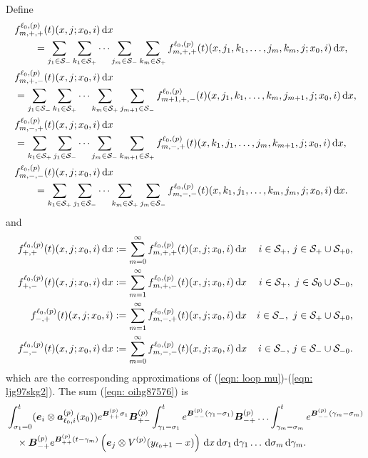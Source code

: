 Define
\begin{align}
	&f_{m,+,+}^{\ell_0,(p)}(t)(x,j;x_0,i) \, \mathrm{d} x \nonumber 
	\\&\qquad= \sum_{j_1\in\mathcal S_-} \sum_{k_1\in\mathcal S_+}\dots \sum_{j_m\in\mathcal S_-}\sum_{k_m\in\mathcal S_+} f_{m,+,+}^{\ell_0,(p)}(t)(x, j_1,k_1,\dots,j_m,k_m, j; x_0,i) \, \mathrm{d} x,\label{eqn: oihg87576}
	\\&f^{\ell_0,(p)}_{m,+,-}(t)(x, j; x_0,i) \, \mathrm{d} x \nonumber
	\\&= \sum_{j_1\in\mathcal S_-} \sum_{k_1\in\mathcal S_+}\dots \sum_{k_m\in\mathcal S_+}\sum_{j_{m+1}\in\mathcal S_-}f^{\ell_0,(p)}_{m+1,+,-}(t)(x, j_1,k_1,\dots,k_m,j_{m+1}, j; x_0,i) \, \mathrm{d} x,
	\\&f^{\ell_0,(p)}_{m,-,+}(t)(x, j; x_0,i) \, \mathrm{d} x \nonumber
	\\&= \sum_{k_1\in\mathcal S_+} \sum_{j_1\in\mathcal S_-}\dots \sum_{j_m\in\mathcal S_-}\sum_{k_{m+1}\in\mathcal S_+}f^{\ell_0,(p)}_{m,-,+}(t)(x, k_1,j_1,\dots,j_m,k_{m+1}, j; x_0,i)  \, \mathrm{d} x,
	\\&f^{\ell_0,(p)}_{m,-,-}(t)(x, j; x_0,i) \, \mathrm{d} x \nonumber 
	\\&\qquad = \sum_{k_1\in\mathcal S_+} \sum_{j_1\in\mathcal S_-}\dots \sum_{k_m\in\mathcal S_+}\sum_{j_m\in\mathcal S_-}f^{\ell_0,(p)}_{m,-,-}(t)(x, k_1, j_1,\dots,k_m,j_m, j; x_0,i) \, \mathrm{d} x.  \label{eqn: many eqns}
\end{align}
and
\begin{align*}
		f^{\ell_0,(p)}_{+,+}(t)(x,j;x_0,i)\, \mathrm{d} x &:= \sum_{m=0}^\infty f^{\ell_0,(p)}_{m,+,+}(t)(x,j;x_0,i)\, \mathrm{d} x & i\in\mathcal{S}_+,\,j\in\mathcal{S}_+\cup\mathcal{S}_{+0},
		\\ f^{\ell_0,(p)}_{+,-}(t)(x,j;x_0,i)\, \mathrm{d} x &:= \sum_{m=1}^\infty f^{\ell_0,(p)}_{m,+,-}(t)(x,j;x_0,i)\, \mathrm{d} x & i\in\mathcal S_+,\,\,j\in\mathcal S_{0}\cup\mathcal{S}_{-0},
		\\ f^{\ell_0,(p)}_{-,+}(t)(x,j;x_0,i) &:= \sum_{m=1}^\infty f^{\ell_0,(p)}_{m,-,+}(t)(x,j;x_0,i)\, \mathrm{d} x & i\in\mathcal S_-,\,\,j\in\mathcal S_{+}\cup\mathcal{S}_{+0},
		\\ f^{\ell_0,(p)}_{-,-}(t)(x,j;x_0,i)\, \mathrm{d} x &:= \sum_{m=0}^\infty f^{\ell_0,(p)}_{m,-,-}(t)(x,j;x_0,i)\, \mathrm{d} x & i\in\mathcal{S}_-,\,j\in\mathcal S_-\cup\mathcal{S}_{-0}.
\end{align*}
which are the corresponding approximations of (\ref{eqn: loop mu})-(\ref{eqn: ljg97skg2}).
The sum (\ref{eqn: oihg87576}) is 
\begin{align}
	&\int_{\sigma_1=0}^t (\boldsymbol e_i\otimes \boldsymbol  a_{\ell_0,i}^{(p)}(x_0)) e^{\boldsymbol{B}^{(p)}_{++}\sigma_1}\boldsymbol{B}^{(p)}_{+-}	\nonumber
	\int_{\gamma_1=\sigma_1}^{t} e^{\boldsymbol{B}^{(p)}_{--}(\gamma_1-\sigma_1)}\boldsymbol{B}^{(p)}_{-+}
	\hdots 
	 \int_{\gamma_m=\sigma_{m}}^{t} e^{\boldsymbol{B}^{(p)}_{--}(\gamma_m-\sigma_{m})}\\&\quad\times\boldsymbol{B}^{(p)}_{-+}
	e^{\boldsymbol{B}^{(p)}_{++}(t-\gamma_m)}\left(\boldsymbol e_j \otimes V^{(p)}(y_{\ell_0+1}-x)\right)\, \mathrm{d} x
	\, \mathrm{d} \sigma_1\, \mathrm{d} \gamma_1\dots \, \mathrm{d} \sigma_m\, \mathrm{d} \gamma_m. \label{eqn: looper}
\end{align}
